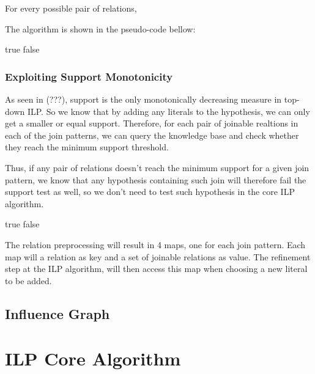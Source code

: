 For every possible pair of relations, 

The algorithm is shown in the pseudo-code bellow:

\begin{algorithm}
		\Return true 
	 \Else
		\Return false
	 \EndIf
 \EndFunction
 
\end{algorithm}

\subsubsection{Exploiting Support Monotonicity}

As seen in (???), support is the only monotonically decreasing measure in top-down ILP. So we know that by adding any literals to the hypothesis, we can only get a smaller or equal support. Therefore, for each pair of joinable realtions in each of the join patterns, we can query the knowledge base and check whether they reach the minimum support threshold.

Thus, if any pair of relations doesn't reach the minimum support for a given join pattern, we know that any hypothesis containing such join will therefore fail the support test as well, so we don't need to test such hypothesis in the core ILP algorithm.



\begin{algorithm}
		\Return true 
	 \Else
		\Return false
	 \EndIf
 \EndFunction
 
\end{algorithm}

The relation preprocessing will result in 4 maps, one for each join pattern. Each map will a relation as key and a set of joinable relations as value. The refinement step at the ILP algorithm, will then access this map when choosing a new literal to be added.


\subsection{Influence Graph}

\section{ILP Core Algorithm}



